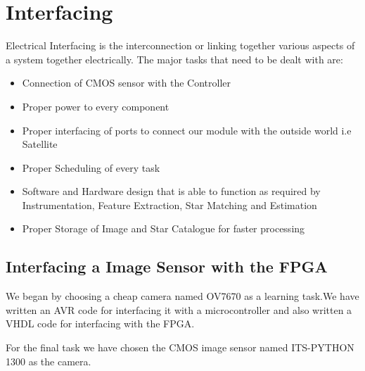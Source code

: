\section{Interfacing}
\thispagestyle{fancy}











Electrical Interfacing is the interconnection or linking together various aspects of a system together electrically. The major tasks that need to be dealt with are:

\begin{itemize}
    \item {Connection of CMOS sensor with the Controller}
    \item {Proper power to every component}
    \item {Proper interfacing of ports to connect our module with the outside world i.e Satellite}
    \item {Proper Scheduling of every task}
    \item {Software and Hardware design that is able to function as required by Instrumentation, Feature Extraction, Star Matching and Estimation}
    \item {Proper Storage of Image and Star Catalogue for faster processing}
\end{itemize}


\subsection{Interfacing a Image Sensor with the FPGA}
We began by choosing a cheap camera named OV7670 as a learning task.We have written an AVR code for interfacing it with a microcontroller and also written a VHDL code for interfacing with the FPGA.

For the final task we have chosen the CMOS image sensor named ITS-PYTHON 1300 as the camera.

